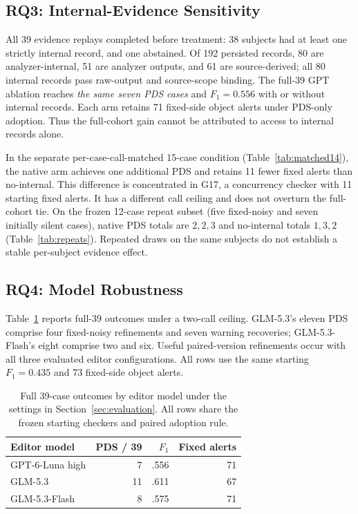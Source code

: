 \subsection{RQ3: Internal-Evidence Sensitivity}

All 39 evidence replays completed before treatment: 38 subjects had at least one strictly internal record, and one abstained. Of 192 persisted records, 80 are analyzer-internal, 51 are analyzer outputs, and 61 are source-derived; all 80 internal records pass raw-output and source-scope binding. The full-39 GPT ablation reaches \emph{the same seven PDS cases} and $F_1=0.556$ with or without internal records. Each arm retains 71 fixed-side object alerts under PDS-only adoption. Thus the full-cohort gain cannot be attributed to access to internal records alone.

In the separate per-case-call-matched 15-case condition (Table~\ref{tab:matched14}), the native arm achieves one additional PDS and retains 11 fewer fixed alerts than no-internal. This difference is concentrated in G17, a concurrency checker with 11 starting fixed alerts. It has a different call ceiling and does not overturn the full-cohort tie. On the frozen 12-case repeat subset (five fixed-noisy and seven initially silent cases), native PDS totals are $2,2,3$ and no-internal totals $1,3,2$ (Table~\ref{tab:repeats}). Repeated draws on the same subjects do not establish a stable per-subject evidence effect.

\subsection{RQ4: Model Robustness}

Table~\ref{tab:models39} reports full-39 outcomes under a two-call ceiling. GLM-5.3's eleven PDS comprise four fixed-noisy refinements and seven warning recoveries; GLM-5.3-Flash's eight comprise two and six. Useful paired-version refinements occur with all three evaluated editor configurations. All rows use the same starting $F_1=0.435$ and 73 fixed-side object alerts.

\begin{table}[t]
\centering\footnotesize
\setlength{\tabcolsep}{4pt}
\caption{Full 39-case outcomes by editor model under the settings in Section~\ref{sec:evaluation}. All rows share the frozen starting checkers and paired adoption rule.}
\label{tab:models39}
\begin{tabular}{@{}lrrr@{}}
\toprule
Editor model & PDS / 39 & $F_1$ & Fixed alerts \\
\midrule
GPT-6-Luna high & 7 & .556 & 71 \\
GLM-5.3 & 11 & .611 & 67 \\
GLM-5.3-Flash & 8 & .575 & 71 \\
\bottomrule
\end{tabular}
\end{table}


